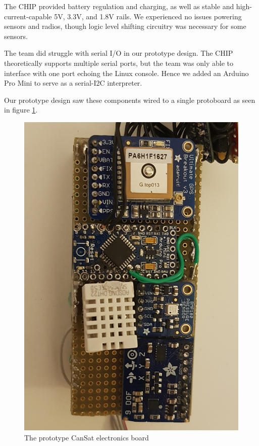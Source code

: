 \documentclass[]{report}
\begin{document}
 		The CHIP provided battery regulation and charging, as well as stable and high-current-capable 5V, 3.3V, and 1.8V rails. We experienced no issues powering sensors and radios, though logic level shifting circuitry was necessary for some sensors.
 		
 		The team did struggle with serial I/O in our prototype design. The CHIP theoretically supports multiple serial ports, but the team was only able to interface with one port echoing the Linux console. Hence we added an Arduino Pro Mini to serve as a serial-I2C interpreter. 
 		
 		Our prototype design saw these components wired to a single protoboard as seen in figure \ref{pboard}.
 		
 		\begin{figure}[h]
 			\hfill\includegraphics[scale=0.1]{protoboard.jpg}\hspace*{\fill}
 			\caption{The prototype CanSat electronics board}
 			\label{pboard}
 		\end{figure}
\end{document}

